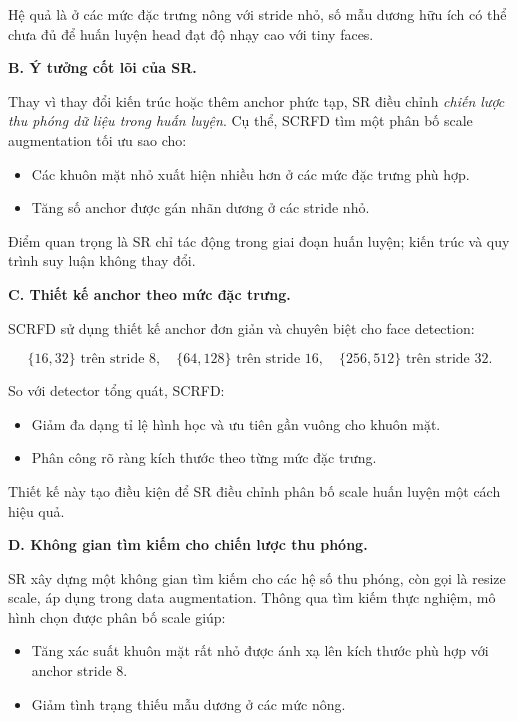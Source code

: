 Hệ quả là ở các mức đặc trưng nông với stride nhỏ, số mẫu dương hữu ích có thể chưa đủ để huấn luyện head đạt độ nhạy cao với tiny faces.

\medskip
\noindent\textbf{B. Ý tưởng cốt lõi của SR.}

Thay vì thay đổi kiến trúc hoặc thêm anchor phức tạp, SR điều chỉnh \textit{chiến lược thu phóng dữ liệu trong huấn luyện}. 
Cụ thể, SCRFD tìm một phân bố scale augmentation tối ưu sao cho:

\begin{itemize}
  \item Các khuôn mặt nhỏ xuất hiện nhiều hơn ở các mức đặc trưng phù hợp.
  \item Tăng số anchor được gán nhãn dương ở các stride nhỏ.
\end{itemize}

Điểm quan trọng là SR chỉ tác động trong giai đoạn huấn luyện; kiến trúc và quy trình suy luận không thay đổi.

\medskip
\noindent\textbf{C. Thiết kế anchor theo mức đặc trưng.}

SCRFD sử dụng thiết kế anchor đơn giản và chuyên biệt cho face detection:

\[
\{16,32\} \text{ trên stride } 8, \quad
\{64,128\} \text{ trên stride } 16, \quad
\{256,512\} \text{ trên stride } 32.
\]

So với detector tổng quát, SCRFD:

\begin{itemize}
  \item Giảm đa dạng tỉ lệ hình học và ưu tiên gần vuông cho khuôn mặt.
  \item Phân công rõ ràng kích thước theo từng mức đặc trưng.
\end{itemize}

Thiết kế này tạo điều kiện để SR điều chỉnh phân bố scale huấn luyện một cách hiệu quả.

\medskip
\noindent\textbf{D. Không gian tìm kiếm cho chiến lược thu phóng.}

SR xây dựng một không gian tìm kiếm cho các hệ số thu phóng, còn gọi là resize scale, áp dụng trong data augmentation. 
Thông qua tìm kiếm thực nghiệm, mô hình chọn được phân bố scale giúp:

\begin{itemize}
  \item Tăng xác suất khuôn mặt rất nhỏ được ánh xạ lên kích thước phù hợp với anchor stride 8.
  \item Giảm tình trạng thiếu mẫu dương ở các mức nông.
\end{itemize}

